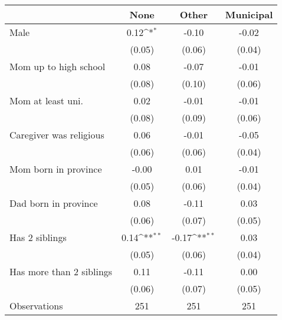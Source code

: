 {
\def\sym#1{\ifmmode^{#1}\else\(^{#1}\)\fi}
\begin{tabular}{l*{3}{c}}
\toprule
                    &\multicolumn{1}{c}{None}&\multicolumn{1}{c}{Other}&\multicolumn{1}{c}{Municipal}\\
\midrule
Male                &        0.12\sym{*}  &       -0.10         &       -0.02         \\
                    &      (0.05)         &      (0.06)         &      (0.04)         \\
\addlinespace
Mom up to high school &        0.08         &       -0.07         &       -0.01         \\
                    &      (0.08)         &      (0.10)         &      (0.06)         \\
\addlinespace
Mom at least uni. &        0.02         &       -0.01         &       -0.01         \\
                    &      (0.08)         &      (0.09)         &      (0.06)         \\
\addlinespace
Caregiver was religious&        0.06         &       -0.01         &       -0.05         \\
                    &      (0.06)         &      (0.06)         &      (0.04)         \\
\addlinespace
Mom born in province&       -0.00         &        0.01         &       -0.01         \\
                    &      (0.05)         &      (0.06)         &      (0.04)         \\
\addlinespace
Dad born in province&        0.08         &       -0.11         &        0.03         \\
                    &      (0.06)         &      (0.07)         &      (0.05)         \\
\addlinespace
Has 2 siblings      &        0.14\sym{**} &       -0.17\sym{**} &        0.03         \\
                    &      (0.05)         &      (0.06)         &      (0.04)         \\
\addlinespace
Has more than 2 siblings&        0.11         &       -0.11         &        0.00         \\
                    &      (0.06)         &      (0.07)         &      (0.05)         \\
\midrule
Observations        &         251         &         251         &         251         \\
\bottomrule
\end{tabular}
}
